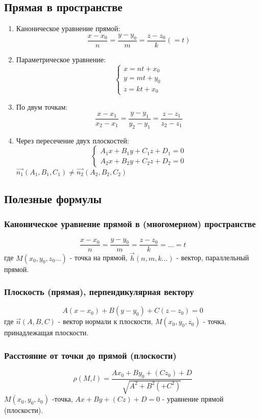 \subsection{Прямая в пространстве}
\begin{enumerate}
\item Каноническое уравнение прямой:
$$\frac{x-x_0}{n}=\frac{y-y_0}{m}=\frac{z-z_0}{k}(=t)$$
\item Параметрическое уравнение: 
$$\begin{cases}x=nt+x_0\\y=mt+y_0\\z=kt+x_0 \end{cases}$$
\item По двум точкам:
$$\frac{x-x_1}{x_2-x_1}=\frac{y-y_1}{y_2-y_1}=\frac{z-z_1}{z_2-z_1}$$
\item Через пересечение двух плоскостей:
$$\begin{cases}A_1x+B_1y+C_1z+D_1=0\\A_2x+B_2y+C_2z+D_2=0  \end{cases}$$
$\Vec{n_1}(A_1,B_1,C_1)\ne\Vec{n_2}(A_2,B_2,C_2)$


\end{enumerate}

\subsection{Полезные формулы}
\subsubsection{Каноническое уравнение прямой в (многомерном) пространстве}
\begin{equation*}
    \boxed{\frac{x-x_0}{n}=\frac{y-y_0}{m}=\frac{z-z_0}{k}=\ldots=t}
\end{equation*}
где $M(x_0,y_0,z_0\ldots)$ - точка на прямой, $\Vec{h}(n,m,k\ldots)$ -
вектор, параллельный прямой. 
\subsubsection{Плоскость (прямая), перпендикулярная вектору}
\begin{equation*}
    \boxed{A(x-x_0)+B(y-y_0)+C(z-z_0)=0}
\end{equation*}
где $\Vec{n}(A,B,C)$ - вектор нормали к плоскости,  $M(x_0,y_0,z_0)$ -
точка, принадлежащая плоскости. 
\subsubsection{Расстояние от точки до прямой (плоскости)}
$$\boxed{\rho(M,l)=\frac{Ax_0+By_0+(Cz_0)+D}{\sqrt{A^2+B^2(+C^2)}}}$$
$M(x_0,y_0,z_0)$ -точка, $Ax+By+(Cz)+D=0$ - уравнение прямой (плоскости).
